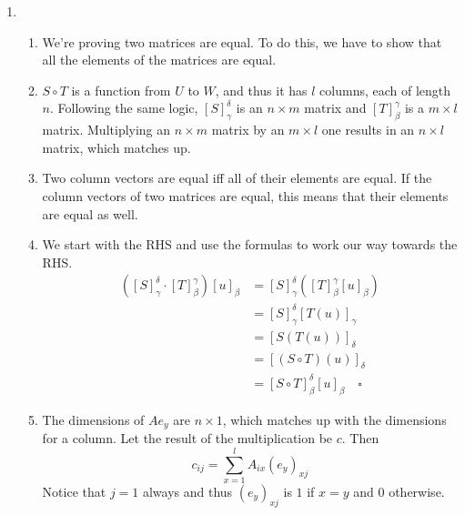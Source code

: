 \documentclass[12pt]{article}
\begin{document}
\begin{enumerate}
      \item \begin{enumerate}
                  \item We're proving two matrices are equal.
                        To do this, we have to show that all the elements of the matrices are equal.
                  \item $S \circ T$ is a function from $U$ to $W$, and thus it has $l$ columns, each of length $n$.
                        Following the same logic, $[S]^\delta_\gamma$ is an $n \times m$ matrix and $[T]^\gamma_\beta$ is a $m \times l$ matrix.
                        Multiplying an $n \times m$ matrix by an $m \times l$ one results in an $n \times l$ matrix, which matches up.
                  \item Two column vectors are equal iff all of their elements are equal.
                        If the column vectors of two matrices are equal, this means that their elements are equal as well.
                  \item We start with the RHS and use the formulas to work our way towards the RHS.
                        \begin{align*}
                              \left([S]^\delta_\gamma \cdot [T]^\gamma_\beta\right)[u]_\beta & = [S]^\delta_\gamma\left([T]^\gamma_\beta[u]_\beta\right) \\
                                                                                             & = [S]^\delta_\gamma [T(u)]_\gamma                         \\
                                                                                             & = [S(T(u))]_\delta                                        \\
                                                                                             & = [(S \circ T)(u)]_\delta                                 \\
                                                                                             & = [S \circ T]^\delta_\beta [u]_\beta \quad\square
                        \end{align*}
                  \item The dimensions of $Ae_y$ are $n \times 1$, which matches up with the dimensions for a column.
                        Let the result of the multiplication be $c$. Then
                        \[c_{ij}=\sum_{x=1}^l A_{ix}(e_y)_{xj}\]
                        Notice that $j=1$ always and thus $(e_y)_{xj}$ is $1$ if $x=y$ and $0$ otherwise.


\end{enumerate}
\end{enumerate}
\end{document}
